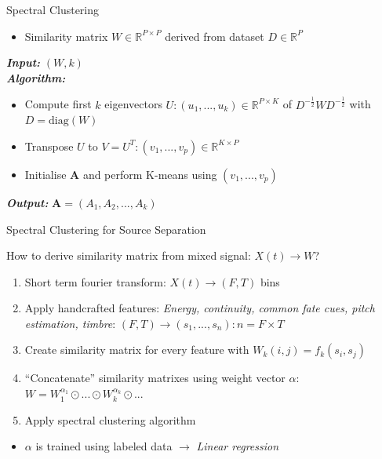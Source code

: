 \documentclass[xcolor=table,mathserif,9pt]{beamer}    %
\begin{document}
\begin{frame}{Spectral Clustering}
\begin{itemize}
	\item Similarity matrix $W \in \mathbb{R}^{P \times P}$ derived from dataset $D \in \mathbb{R}^P$
\end{itemize}
\vspace{10mm}
\begin{algorithm}[H]
	\LinesNumbered
	\emph{\textbf{Input: }} $(W, k)$ \\
	\emph{\textbf{Algorithm: }}
	\begin{itemize}
		\item Compute first $k$ eigenvectors $U: (u_1,... ,u_k) \in \mathbb{R}^{P \times K}$ of $D^{-\frac{1}{2}}WD^{-\frac{1}{2}}$ with $D = \text{diag}(W)$
		\item Transpose $U$ to $V = U^T: (v_1,... ,v_p) \in \mathbb{R}^{K \times P}$ 
		\item Initialise \textbf{A} and perform K-means \cite{Steinhaus56} using $(v_1,... ,v_p)$ 
	\end{itemize}
	\emph{\textbf{Output: }}$\textbf{A} = (A_1, A_2, ..., A_k)$
\end{algorithm}
\end{frame}

\begin{frame}{Spectral Clustering for Source Separation \cite{Bach:2006}}
	
How to derive similarity matrix from mixed signal: \emph{$X(t) \to W$}?
\vspace{10mm}
\begin{enumerate}
	\item Short term fourier transform: $X(t) \to (F,T)$ bins
	\item Apply handcrafted features: \emph{Energy, continuity, common fate cues, pitch estimation, timbre}: $(F,T) \to (s_1, ...,s_n): n = F \times T$
	\item Create similarity matrix for every feature with $W_k(i,j) = f_k(s_i,s_j)$
	\item ``Concatenate'' similarity matrixes using weight vector $\alpha$: $W = W_1^{\alpha_1} \odot ... \odot W_k^{\alpha_k} \odot ...$ 
	\item Apply spectral clustering algorithm 
\end{enumerate}
\vspace{10mm}

\begin{itemize}
	\item $\alpha$ is trained using labeled data $\to$ \emph{Linear regression}
\end{itemize}


\end{frame}
\end{document}

